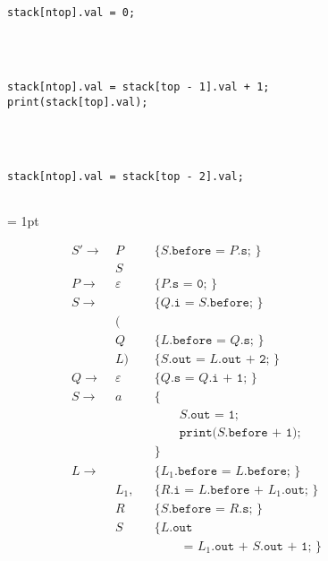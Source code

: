 \documentclass{article}
\begin{document}
\begin{figure}[H]
\begin{multicols}{2}
\begin{lstlisting}
stack[ntop].val = 0;




stack[ntop].val = stack[top - 1].val + 1;
print(stack[top].val);




stack[ntop].val = stack[top - 2].val;


    \end{lstlisting}
    \end{multicols}
\end{figure}

\begin{figure}[H]
    \centering
    \columnseprule = 1pt
    \begin{multicols}{2}
    \begin{align*}
        S' \rightarrow\ &P&& \texttt{\{ }S\texttt{.before = }P\texttt{.s; \}}\\
                        &S&& \\
        P \rightarrow\  &\varepsilon&& \texttt{\{ }P\texttt{.s = 0; \}} \\
        S \rightarrow\  & && \texttt{\{ }Q\texttt{.i = }S\texttt{.before; \}} \\
                        &(&& \\
                        &Q&&\texttt{\{ }L\texttt{.before = }Q\texttt{.s; \}} \\
                        &L)&& \texttt{\{ }S\texttt{.out = }L\texttt{.out + 2; \}} \\
        Q \rightarrow\  &\varepsilon&& \texttt{\{ }Q\texttt{.s = }Q\texttt{.i + 1; \}} \\
        S \rightarrow\  &a&& \texttt{\{} \\
                        & && \qquad S\texttt{.out = 1;} \\
                        & && \qquad \texttt{print(}S\texttt{.before + 1);} \\
                        & && \texttt{\}}\\
        L \rightarrow\  & && \texttt{\{ }L_1\texttt{.before = }L\texttt{.before; \}}\\
                        &L_1,&& \texttt{\{ }R\texttt{.i = }L\texttt{.before + }L_1\texttt{.out; \}}\\
                        &R&& \texttt{\{ }S\texttt{.before = }R\texttt{.s; \}}\\
                        &S&& \texttt{\{ }L\texttt{.out} \\
                        & && \qquad \texttt{ = }L_1\texttt{.out + }S\texttt{.out + 1; \}} \\

\end{align*}
\end{multicols}
\end{figure}
\end{document}
